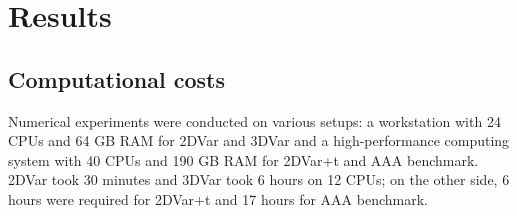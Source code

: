 



\section*{Results}
\label{sec:Results}
\label{ch:chapter_three}

\subsection*{Computational costs}
Numerical experiments were conducted on various setups: a workstation with 24 CPUs and 64 GB RAM for 2DVar and 3DVar and a high-performance computing system with 40 CPUs and 190 GB RAM for 2DVar+t and AAA benchmark. 2DVar took 30 minutes and 3DVar took 6 hours on 12 CPUs; on the other side, 6 hours were required for 2DVar+t and 17 hours for AAA benchmark.

